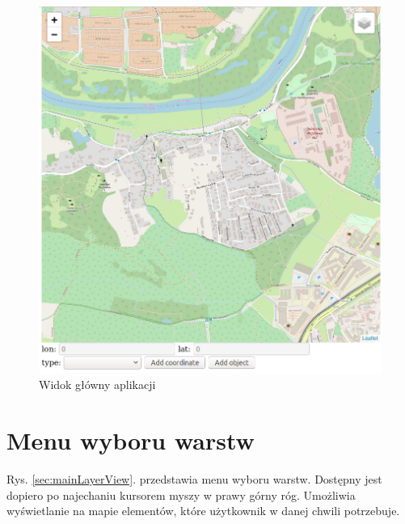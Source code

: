 \newpage
\begin{figure}[h]
\caption{Widok główny aplikacji}
\label{mainView}
\centering
\includegraphics[width=1.02\textwidth]{mainScreen}
\end{figure}

\newpage

\section{Menu wyboru warstw}
\label{sec:layerMenu}

Rys. \ref{sec:mainLayerView}. przedstawia menu wyboru warstw. Dostępny jest dopiero po najechaniu kursorem myszy w prawy górny róg. Umożliwia wyświetlanie na mapie elementów, które użytkownik w danej chwili potrzebuje. 

